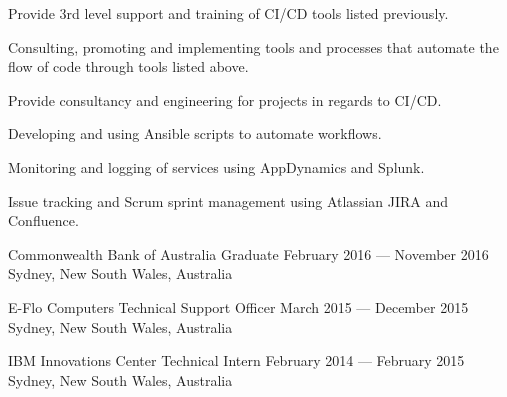 \begin{cventries}
{\begin{cvitems}
      \item {Provide 3rd level support and training of CI/CD tools listed previously.}
      \item {Consulting, promoting and implementing tools and processes that automate the flow of code through tools listed above.}
      \item {Provide consultancy and engineering for projects in regards to CI/CD.}
      \item {Developing and using Ansible scripts to automate workflows.}
      \item {Monitoring and logging of services using AppDynamics and Splunk.}
      \item {Issue tracking and Scrum sprint management using Atlassian JIRA and Confluence.}
    \end{cvitems}
  }

  \cventry
  {Commonwealth Bank of Australia} %
  {Graduate} %
  {February 2016 --- November 2016} %
  {Sydney, New South Wales, Australia} %
  {} %
  {} %
  {} %

  \cventry
  {E-Flo Computers} %
  {Technical Support Officer} %
  {March 2015 --- December 2015} %
  {Sydney, New South Wales, Australia} %
  {} %
  {} %
  {} %

  \cventry
  {IBM} %
  {Innovations Center Technical Intern} %
  {February 2014 --- February 2015} %
  {Sydney, New South Wales, Australia} %
  {} %
  {} %
  {} %

\end{cventries}

